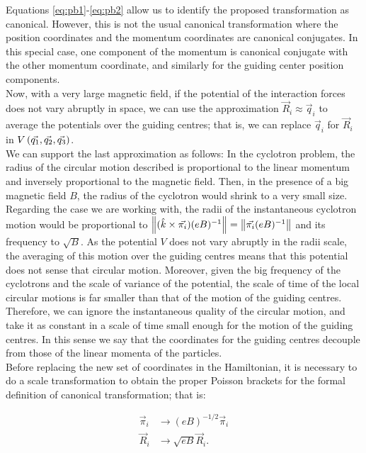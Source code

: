 Equations \eqref{eq:pb1}-\eqref{eq:pb2} allow us to identify the proposed transformation as canonical. However, this is not the usual canonical transformation where the position coordinates and the momentum coordinates are canonical conjugates. In this special case, one component of the momentum is canonical conjugate with the other momentum coordinate, and similarly for the guiding center position components.\\

Now, with a very large magnetic field, if the potential of the interaction forces does not vary abruptly in space, we can use the approximation $\vec{R}_i \approx \vec{q}_i$ to average the potentials over the guiding centres; that is, we can replace $\vec{q}_i$ for $\vec{R}_i$ in  $V \left(  \vec{q_1},\vec{q_2},\vec{q_3}  \right)$.\\

We can support the last approximation as follows: In the cyclotron problem, the radius of the circular motion described is proportional to the linear momentum and inversely proportional to the magnetic field. Then, in the presence of a big magnetic field $B$, the radius of the cyclotron would shrink to a very small size. Regarding the case we are working with, the radii of the instantaneous cyclotron motion would be proportional to $\left\lVert (\hat{k} \times \vec{\pi_i})(eB)^{-1} \right\rVert = \left\lVert \vec{\pi_i}(eB)^{-1} \right\rVert$ and its frequency to $\sqrt{B}$. As the potential $V$ does not vary abruptly in the radii scale, the averaging of this motion over the guiding centres means that this potential does not sense that circular motion. Moreover, given the big frequency of the cyclotrons and the scale of variance of the potential, the scale of time of the local circular motions is far smaller than that of the motion of the guiding centres. Therefore, we can ignore the instantaneous quality of the circular motion, and take it as constant in a scale of time small enough for the motion of the guiding centres. In this sense we say that the coordinates for the guiding centres decouple from those of the linear momenta of the particles.\\

Before replacing the new set of coordinates in the Hamiltonian, it is necessary to do a scale transformation to obtain the proper Poisson brackets for the formal definition of canonical transformation; that is:

\begin{align*}
\vec{\pi}_i & \rightarrow (eB)^{-1/2} \vec{ \pi}_i\\
\vec{R}_i & \rightarrow \sqrt{eB} \vec{R}_i.
\end{align*}

